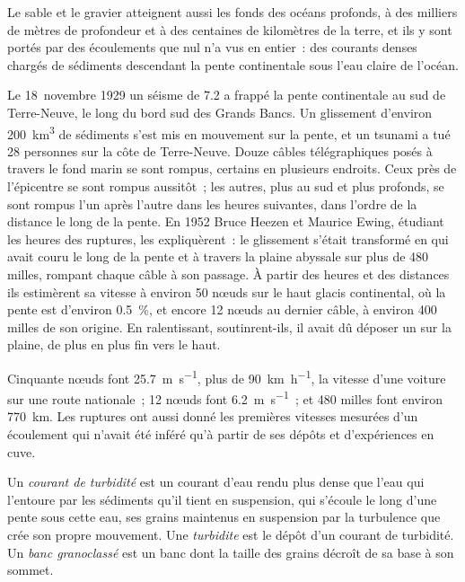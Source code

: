 Le sable et le gravier atteignent aussi les fonds des océans profonds, à des milliers de mètres
de profondeur et à des centaines de kilomètres de la terre, et ils y sont portés par des écoulements
que nul n'a vus en entier~: des courants denses chargés de sédiments descendant
la pente continentale sous l'eau claire de l'océan.

\begin{history}
Le 18~novembre 1929 un séisme de  7.2 a frappé la pente continentale
au sud de Terre-Neuve, le long du bord sud des Grands Bancs. Un glissement
d'environ \qty{200}{km^3} de sédiments s'est mis en mouvement sur la pente, et un tsunami a tué 28
personnes sur la côte de Terre-Neuve. Douze câbles télégraphiques posés à travers le
fond marin se sont rompus, certains en plusieurs endroits. Ceux près de l'épicentre se sont rompus aussitôt~;
les autres, plus au sud et plus profonds, se sont rompus l'un après l'autre dans les heures
suivantes, dans l'ordre de la distance le long de la pente. En 1952 Bruce Heezen et Maurice Ewing,
étudiant les heures des ruptures, les expliquèrent~: le glissement s'était transformé en
 qui avait couru le long de la pente et à travers la plaine abyssale sur
plus de 480 milles, rompant chaque câble à son passage. À partir des heures et des
distances ils estimèrent sa vitesse à environ 50 nœuds sur le haut glacis continental,
où la pente est d'environ \qty{0.5}{\percent}, et encore 12 nœuds au
dernier câble, à environ 400 milles de son origine. En ralentissant, soutinrent-ils, il avait dû
déposer un  sur la plaine, de plus en plus fin vers le haut.
\end{history}

Cinquante nœuds font \qty{25.7}{m.s^{-1}}, plus de \qty{90}{km.h^{-1}}, la vitesse d'une
voiture sur une route nationale~; 12 nœuds font \qty{6.2}{m.s^{-1}}~; et 480 milles font environ
\qty{770}{km}. Les ruptures ont aussi donné les premières vitesses mesurées d'un écoulement qui
n'avait été inféré qu'à partir de ses dépôts et d'expériences en cuve.

\begin{definition}\label{def:b1:clastic-sediments:turbidite}
Un \emph{courant de turbidité} est un courant d'eau rendu
plus dense que l'eau qui l'entoure par les sédiments qu'il tient en suspension, qui
s'écoule le long d'une pente sous cette eau, ses grains maintenus en suspension par la
turbulence que crée son propre mouvement. Une \emph{turbidite} est
le dépôt d'un courant de turbidité. Un \emph{banc granoclassé} est un
banc dont la taille des grains décroît de sa base à son sommet.
\end{definition}

